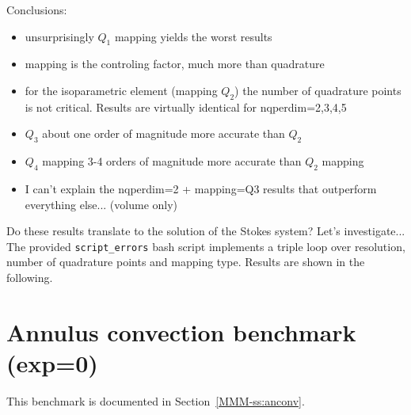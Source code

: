 \noindent Conclusions:
\begin{itemize}
\item unsurprisingly $Q_1$ mapping yields the worst results
\item mapping is the controling factor, much more than quadrature
\item for the isoparametric element (mapping $Q_2$) the number of quadrature points 
is not critical. Results are virtually identical for {\python nqperdim=2,3,4,5}
\item $Q_3$ about one order of magnitude more accurate than $Q_2$ 
\item $Q_4$ mapping 3-4 orders of magnitude more accurate than $Q_2$ mapping
\item I can't explain the {\python nqperdim=2 + mapping=Q3} results that outperform everything else... (volume only)
\end{itemize}

Do these results translate to the solution of the Stokes system? Let's investigate...
The provided {\tt script\_errors} bash script implements a triple loop 
over resolution, number of quadrature points and mapping type.
Results are shown in the following.

\newpage
\section*{Annulus convection benchmark (exp=0)}


This benchmark is documented in Section~\ref{MMM-ss:anconv}.

